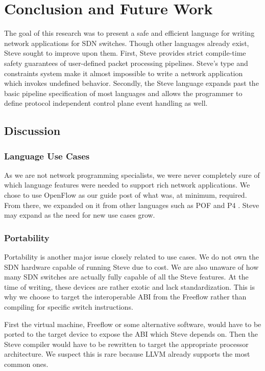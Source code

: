 \chapter{ Conclusion and Future Work} \label{ch:conclusion}

The goal of this research was to present a safe and efficient language for writing network applications for SDN switches. Though other languages already exist, Steve sought to improve upon them. First, Steve provides strict compile-time safety guarantees of user-defined packet processing pipelines.
Steve's type and constraints system make it almost impossible to write a network application which invokes undefined behavior.
Secondly, the Steve language expands past the basic pipeline specification of most languages and allows the programmer to define protocol independent control plane event handling as well.

\section{Discussion}

\subsection{Language Use Cases}

As we are not network programming specialists, we were never completely sure of which language features were needed to support rich network applications. We chose to use OpenFlow \cite{openflow_spec} as our guide post of what was, at minimum, required. From there, we expanded on it from other languages such as POF \cite{pof, pof_fis, pof_impl} and P4 \cite{pof, p42014, p4_spec}. Steve may expand as the need for new use cases grow.

\subsection{Portability}

Portability is another major issue closely related to use cases. We do not own the SDN hardware capable of running Steve due to cost. We are also unaware of how many SDN switches are actually fully capable of all the Steve features. At the time of writing, these devices are rather exotic and lack standardization. This is why we choose to target the interoperable ABI from the Freeflow rather than compiling for specific switch instructions.

First the virtual machine, Freeflow \cite{freeflow_software} or some alternative software, would have to be ported to the target device to expose the ABI which Steve depends on. Then the Steve compiler would have to be rewritten to target the appropriate processor architecture. We suspect this is rare because LLVM already supports the most common ones.

